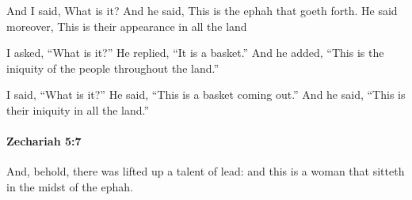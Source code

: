 			\begin{versebox}
					\item[BHS] 
					\item[LXX] 
					\item[ASV] And I said, What is it? And he said, This is the ephah that goeth forth. He said moreover, This is their appearance in all the land
					\item[NIV] I asked, “What is it?” He replied, “It is a basket.” And he added, “This is the iniquity of the people throughout the land.”
					\item[NRSV] I said, “What is it?” He said, “This is a basket coming out.” And he said, “This is their iniquity in all the land.”
			\end{versebox}

		\paragraph{Zechariah 5:7} %
			\label{ZECHARIAH-5-7}

			And, behold, there was lifted up a talent of lead: and this is a woman that sitteth in the midst of the ephah.

